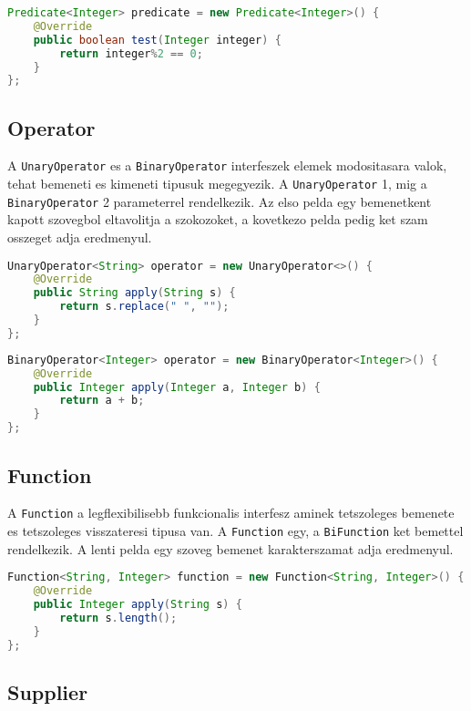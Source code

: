\documentclass{article}
\let\l\lstinline
\begin{document}
\begin{lstlisting}[language=Java, caption=Pelda Predicate]
Predicate<Integer> predicate = new Predicate<Integer>() {
	@Override
	public boolean test(Integer integer) {
		return integer%2 == 0;
	}
};
\end{lstlisting}

\subsection{Operator}

A \l{UnaryOperator} es a \l{BinaryOperator} interfeszek elemek modositasara valok, tehat bemeneti es kimeneti tipusuk megegyezik. A \l{UnaryOperator} 1, mig a \l{BinaryOperator} 2 parameterrel rendelkezik. Az elso pelda egy bemenetkent kapott szovegbol eltavolitja a szokozoket, a kovetkezo pelda pedig ket szam osszeget adja eredmenyul.

\begin{lstlisting}[language=Java, caption=Pelda UnaryOperator]
UnaryOperator<String> operator = new UnaryOperator<>() {
	@Override
	public String apply(String s) {
		return s.replace(" ", "");
	}
};
\end{lstlisting}

\begin{lstlisting}[language=Java, caption=Pelda BinaryOperator]
BinaryOperator<Integer> operator = new BinaryOperator<Integer>() {
	@Override
	public Integer apply(Integer a, Integer b) {
		return a + b;
	}
};
\end{lstlisting}

\subsection{Function}

A \l{Function} a legflexibilisebb funkcionalis interfesz aminek tetszoleges bemenete es tetszoleges visszateresi tipusa van. A \l{Function} egy, a \l{BiFunction} ket bemettel rendelkezik. A lenti pelda egy szoveg bemenet karakterszamat adja eredmenyul.

\begin{lstlisting}[language=Java, caption=Pelda Function]
Function<String, Integer> function = new Function<String, Integer>() {
	@Override
	public Integer apply(String s) {
		return s.length();
	}
};
\end{lstlisting}

\subsection{Supplier}
\end{document}
